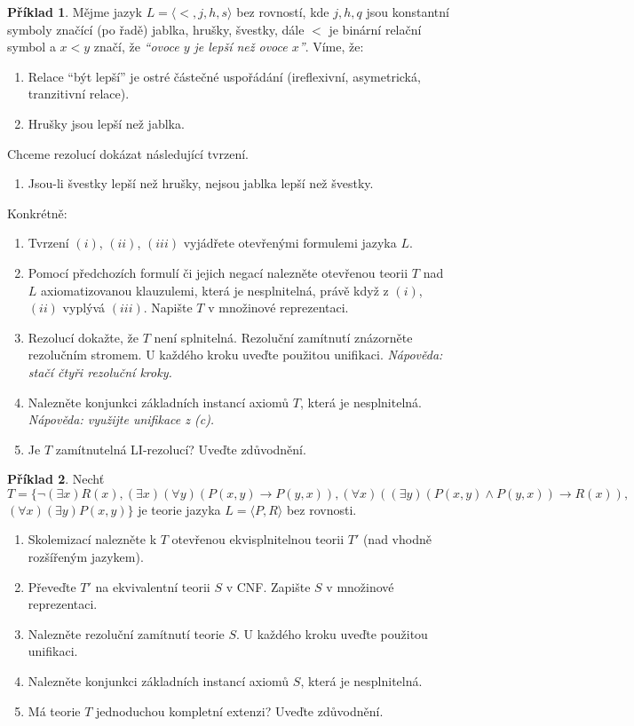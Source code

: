 \documentclass[a4paper]{article}
\theoremstyle{definition}
\newtheorem{problem}{Příklad}
\begin{document}
\medskip\begin{problem}
Mějme jazyk $L=\langle <, j, h, s\rangle$ bez rovností, kde $j,h,q$ jsou konstantní symboly značící (po řadě) jablka, hrušky, švestky, dále $<$ je binární relační symbol a $x < y$ značí, že {\it ``ovoce $y$ je lepší než ovoce $x$''}. Víme, že:
\begin{enumerate}[label=(\roman*)]\it
    \item Relace ``být lepší'' je ostré částečné uspořádání (ireflexivní, asymetrická, tranzitivní relace).
    \item Hrušky jsou lepší než jablka.
\end{enumerate}
Chceme rezolucí dokázat následující tvrzení.
\begin{enumerate}[label=(\roman*)]\it
    \setcounter{enumi}{2}
    \item Jsou-li švestky lepší než hrušky, nejsou jablka lepší než švestky.
\end{enumerate}
\smallskip

Konkrétně:
\begin{enumerate}
\item Tvrzení $(i)$, $(ii)$, $(iii)$ vyjádřete otevřenými formulemi jazyka $L$.
\item Pomocí předchozích formulí či jejich negací nalezněte otevřenou teorii $T$ nad $L$ axiomatizovanou klauzulemi, která je nesplnitelná, právě když z $(i)$, $(ii)$ vyplývá $(iii)$. Napište $T$ v množinové reprezentaci.
\item Rezolucí dokažte, že $T$ není splnitelná. Rezoluční zamítnutí znázorněte rezolučním stromem. U každého kroku uveďte použitou unifikaci. {\it Nápověda: stačí čtyři rezoluční kroky.}
\item Nalezněte konjunkci základních instancí axiomů $T$, která je nesplnitelná. {\it Nápověda: využijte unifikace z (c).}
\item Je $T$ zamítnutelná LI-rezolucí? Uveďte zdůvodnění.
\end{enumerate}
\end{problem}


\medskip\begin{problem}
Nechť $T=\{\neg(\exists x) R(x), (\exists x)(\forall y)(P(x,y)\to P(y,x)), (\forall x)((\exists y)(P(x,y)\wedge P(y,x))\to R(x)),$ $(\forall x)(\exists y)P(x,y)\}$ je teorie jazyka $L=\langle P,R\rangle$ bez rovnosti.
\begin{enumerate}
\item Skolemizací nalezněte k $T$ otevřenou ekvisplnitelnou teorii $T'$ (nad vhodně rozšířeným jazykem).
\item Převeďte $T'$ na ekvivalentní teorii $S$ v CNF. Zapište $S$ v množinové reprezentaci.
\item Nalezněte rezoluční zamítnutí teorie $S$. U každého kroku uveďte použitou unifikaci.
\item Nalezněte konjunkci základních instancí axiomů $S$, která je nesplnitelná.
\item Má teorie $T$ jednoduchou kompletní extenzi? Uveďte zdůvodnění.
\end{enumerate}
\end{problem}
\end{document}
